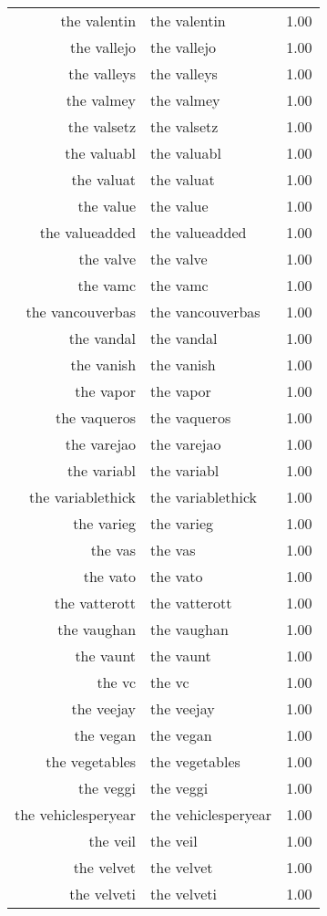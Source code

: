 \begin{table}[ht]
\begin{tabular}{rlr}
  the valentin & the valentin & 1.00 \\ 
  the vallejo & the vallejo & 1.00 \\ 
  the valleys & the valleys & 1.00 \\ 
  the valmey & the valmey & 1.00 \\ 
  the valsetz & the valsetz & 1.00 \\ 
  the valuabl & the valuabl & 1.00 \\ 
  the valuat & the valuat & 1.00 \\ 
  the value & the value & 1.00 \\ 
  the valueadded & the valueadded & 1.00 \\ 
  the valve & the valve & 1.00 \\ 
  the vamc & the vamc & 1.00 \\ 
  the vancouverbas & the vancouverbas & 1.00 \\ 
  the vandal & the vandal & 1.00 \\ 
  the vanish & the vanish & 1.00 \\ 
  the vapor & the vapor & 1.00 \\ 
  the vaqueros & the vaqueros & 1.00 \\ 
  the varejao & the varejao & 1.00 \\ 
  the variabl & the variabl & 1.00 \\ 
  the variablethick & the variablethick & 1.00 \\ 
  the varieg & the varieg & 1.00 \\ 
  the vas & the vas & 1.00 \\ 
  the vato & the vato & 1.00 \\ 
  the vatterott & the vatterott & 1.00 \\ 
  the vaughan & the vaughan & 1.00 \\ 
  the vaunt & the vaunt & 1.00 \\ 
  the vc & the vc & 1.00 \\ 
  the veejay & the veejay & 1.00 \\ 
  the vegan & the vegan & 1.00 \\ 
  the vegetables & the vegetables & 1.00 \\ 
  the veggi & the veggi & 1.00 \\ 
  the vehiclesperyear & the vehiclesperyear & 1.00 \\ 
  the veil & the veil & 1.00 \\ 
  the velvet & the velvet & 1.00 \\ 
  the velveti & the velveti & 1.00 \\ 

\end{tabular}
\end{table}
